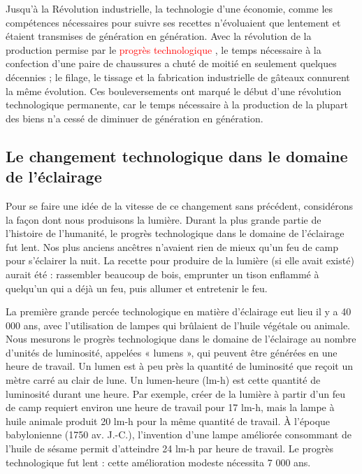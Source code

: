 \documentclass[11pt]{amsart}
\newcommand{\rolered}[1]{ \textcolor{red}{#1} }
\begin{document}
Jusqu’à la Révolution industrielle, la technologie d’une économie, comme les compétences nécessaires pour suivre ses recettes n’évoluaient que lentement et étaient transmises de génération en génération. Avec la révolution de la production permise par le \rolered{ progrès technologique}, le temps nécessaire à la confection d’une paire de chaussures a chuté de moitié en seulement quelques décennies ; le filage, le tissage et la fabrication industrielle de gâteaux connurent la même évolution. Ces bouleversements ont marqué le début d’une révolution technologique permanente, car le temps nécessaire à la production de la plupart des biens n’a cessé de diminuer de génération en génération.


\hypertarget{x-le-changement-technologique-dans-le-domaine-de-l’éclairage}{\subsection*{Le changement technologique dans le domaine de l’éclairage}}
Pour se faire une idée de la vitesse de ce changement sans précédent, considérons la façon dont nous produisons la lumière. Durant la plus grande partie de l’histoire de l’humanité, le progrès technologique dans le domaine de l’éclairage fut lent. Nos plus anciens ancêtres n’avaient rien de mieux qu’un feu de camp pour s’éclairer la nuit. La recette pour produire de la lumière (si elle avait existé) aurait été : rassembler beaucoup de bois, emprunter un tison enflammé à quelqu’un qui a déjà un feu, puis allumer et entretenir le feu.


La première grande percée technologique en matière d’éclairage eut lieu il y a 40 000 ans, avec l’utilisation de lampes qui brûlaient de l’huile végétale ou animale. Nous mesurons le progrès technologique dans le domaine de l’éclairage au nombre d’unités de luminosité, appelées « lumens », qui peuvent être générées en une heure de travail. Un lumen est à peu près la quantité de luminosité que reçoit un mètre carré au clair de lune. Un lumen-heure (lm-h) est cette quantité de luminosité durant une heure. Par exemple, créer de la lumière à partir d’un feu de camp requiert environ une heure de travail pour 17 lm-h, mais la lampe à huile animale produit 20 lm-h pour la même quantité de travail. À l’époque babylonienne (1750 av. J.-C.), l’invention d’une lampe améliorée consommant de l’huile de sésame permit d’atteindre 24 lm-h par heure de travail. Le progrès technologique fut lent : cette amélioration modeste nécessita 7 000 ans.
\end{document}
